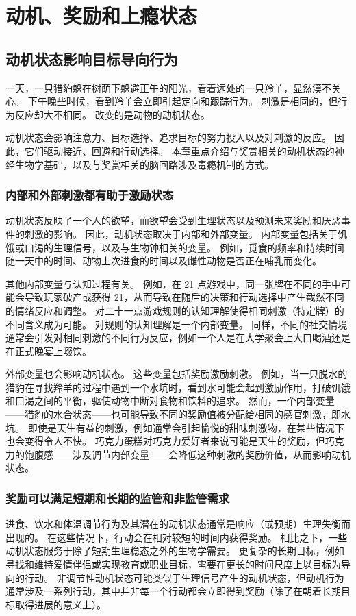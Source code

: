 \chapter{动机、奖励和上瘾状态} \label{chap:chap43}

\section{动机状态影响目标导向行为}
一天，一只猎豹躲在树荫下躲避正午的阳光，看着远处的一只羚羊，显然漠不关心。 下午晚些时候，看到羚羊会立即引起定向和跟踪行为。 刺激是相同的，但行为反应却大不相同。 改变的是动物的动机状态。

动机状态会影响注意力、目标选择、追求目标的努力投入以及对刺激的反应。 因此，它们驱动接近、回避和行动选择。 本章重点介绍与奖赏相关的动机状态的神经生物学基础，以及与奖赏相关的脑回路涉及毒瘾机制的方式。

\subsection{内部和外部刺激都有助于激励状态}
动机状态反映了一个人的欲望，而欲望会受到生理状态以及预测未来奖励和厌恶事件的刺激的影响。 因此，动机状态取决于内部和外部变量。 内部变量包括关于饥饿或口渴的生理信号，以及与生物钟相关的变量。 例如，觅食的频率和持续时间随一天中的时间、动物上次进食的时间以及雌性动物是否正在哺乳而变化。

其他内部变量与认知过程有关。 例如，在 21 点游戏中，同一张牌在不同的手中可能会导致玩家破产或获得 21，从而导致在随后的决策和行动选择中产生截然不同的情绪反应和调整。 对二十一点游戏规则的认知理解使得相同刺激（特定牌）的不同含义成为可能。 对规则的认知理解是一个内部变量。 同样，不同的社交情境通常会引发对相同刺激的不同行为反应，例如一个人是在大学聚会上大口喝酒还是在正式晚宴上啜饮。

外部变量也会影响动机状态。 这些变量包括奖励激励刺激。 例如，当一只脱水的猎豹在寻找羚羊的过程中遇到一个水坑时，看到水可能会起到激励作用，打破饥饿和口渴之间的平衡，驱使动物中断对食物和饮料的追求。 然而，一个内部变量——猎豹的水合状态——也可能导致不同的奖励值被分配给相同的感官刺激，即水坑。 即使是天生有益的刺激，例如通常会引起愉悦的甜味刺激物，在某些情况下也会变得令人不快。 巧克力蛋糕对巧克力爱好者来说可能是天生的奖励，但巧克力的饱腹感——涉及调节内部变量——会降低这种刺激的奖励价值，从而影响动机状态。

\subsection{奖励可以满足短期和长期的监管和非监管需求}
进食、饮水和体温调节行为及其潜在的动机状态通常是响应（或预期）生理失衡而出现的。 在这些情况下，行动会在相对较短的时间内获得奖励。 相比之下，一些动机状态服务于除了短期生理稳态之外的生物学需要。 更复杂的长期目标，例如寻找和维持爱情伴侣或实现教育或职业目标，需要在更长的时间尺度上以目标为导向的行动。 非调节性动机状态可能类似于生理信号产生的动机状态，但动机行为通常涉及一系列行动，其中并非每一个行动都会立即得到奖励（除了在朝着长期目标取得进展的意义上）。

